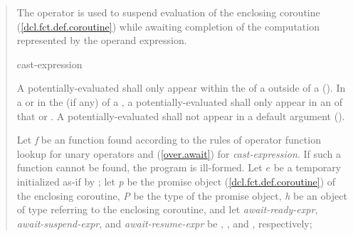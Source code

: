 \begin{quote}
\pnum
The  operator is used to suspend evaluation of the enclosing coroutine (\ref{dcl.fct.def.coroutine}) while awaiting completion of the computation represented by the operand expression.

\begin{bnf}
  \br
   cast-expression
\end{bnf}

\pnum
A potentially-evaluated 
 shall only appear within the  of a  outside of a  ().
%
In a  or in the  (if any) of a , a potentially-evaluated  shall only appear in an  of that  or .
%
%
A potentially-evaluated  shall not appear in a default argument ().

\pnum
Let \textit{f} be an  function found according to the rules of operator function lookup for unary operators and (\ref{over.await}) for \textit{cast-expression}. If such a function cannot be found, the program is ill-formed. 
Let $e$ be a temporary initialized as-if by ; let \textit{p} be the promise object (\ref{dcl.fct.def.coroutine})
of the enclosing coroutine, \textit{P} be the type of the promise object, \textit{h} be an object of type   referring to the enclosing coroutine, and let \textit{await-ready-expr}, \textit{await-suspend-expr}, and \textit{await-resume-expr} be
, , and , respectively;

%
%


\end{quote}

